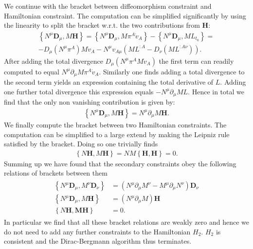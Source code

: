 \documentclass[a4paper,12pt, DIV=14, BCOR=5mm, twoside, headsepline]{scrbook}
\begin{document}
We continue with the bracket between diffeomorphism constraint and Hamiltonian constraint. The computation can be simplified significantly by using the linearity to split the bracket w.r.t. the two contributions from $\mathbf{H}$: 
\begin{multline}
    \left \{ N^{\mu}\mathbf{D}_{\mu}, M \mathbf{H} \right \} = \left \{ N^\mu \mathbf{D}_\mu , M \pi^A \dot{v}_A   \right \} - \left \{ N^\mu \mathbf{D}_\mu , M L_{t_0}  \right \} = \\
    - D_\mu (N^\mu \pi^A) M \dot{v}_A - N^\mu v_{A\mu} (M L^{:A} - D_\nu (M L^{:A \nu}))  .
\end{multline}
After adding the total divergence $D_{\mu}(N^\mu \pi^A M \dot{v}_A)$ the first term can readily computed to equal $N^\mu \partial_\mu M \pi^A \dot{v}_A$. Similarly one finds adding a total divergence to the second term yields an expression containing the total derivative of $L$. Adding one further total divergence this expression equals $-N^\mu \partial _\mu M L$. Hence in total we find that the only non vanishing contribution is given by:
\begin{align}
    \left \{ N^{\mu}\mathbf{D}_{\mu}, M \mathbf{H} \right \} = N^\mu \partial_\mu M \mathbf{H}.
\end{align}
We finally compute the bracket between two Hamiltonian constraints. The computation can be simplified to a large extend by making the Leipniz rule satisfied by the bracket. Doing so one trivially finds 
\begin{align}
    \left \{N \mathbf{H}, M \mathbf{H} \right \} = N M \left \{ \mathbf{H}, \mathbf{H}\right \} = 0.
\end{align}
Summing up we have found that the secondary constraints obey the following relations of brackets between them
\begin{align}
    \begin{aligned}
    \left \{N^\mu \mathbf{D}_\mu, M^\nu \mathbf{D}_\nu \right \} &= (N^\mu \partial_\mu M^\nu - M^\mu \partial _\mu N^\nu)\mathbf{D}_{\nu}\\
    \left \{ N^\mu \mathbf{D}_\mu , M \mathbf{H}\right \} &= (N^\mu \partial_\mu M) \mathbf{H}\\
    \left \{N \mathbf{H , M \mathbf{H}} \right \} &= 0.
    \end{aligned}
\end{align}
In particular we find that all these bracket relations are weakly zero and hence we do not need to add any further constraints to the Hamiltonian $H_2$. $H_2$ is consistent and the Dirac-Bergmann algorithm thus terminates. 
\end{document}
